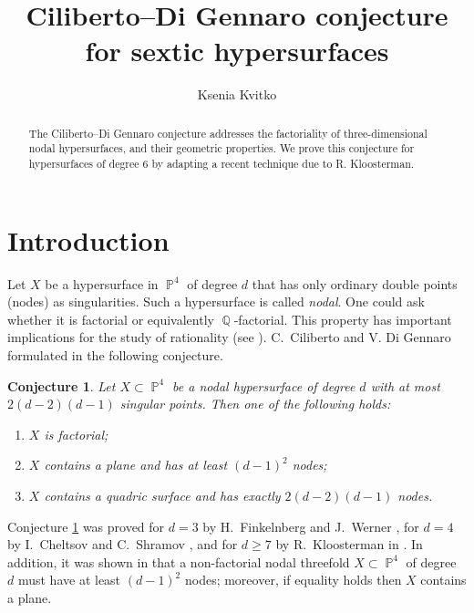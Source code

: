 \documentclass[a4paper,11pt,english,german]{amsart}
\title{Ciliberto--Di Gennaro conjecture for sextic hypersurfaces}
\author{Ksenia Kvitko}
\DeclareMathOperator{\IP}{\mathbb{P}}
\DeclareMathOperator{\Q}{\mathbb{Q}}
\newtheorem{conj}[thm]{Conjecture}
\theoremstyle{definition}
\begin{document}
\begin{abstract}
The Ciliberto--Di Gennaro conjecture addresses the factoriality of three-dimensional nodal hypersurfaces, and their geometric properties. We prove this conjecture for hypersurfaces of degree 6 by adapting a recent technique due to R. Kloosterman.
\end{abstract}

\maketitle

\tableofcontents 

\section{Introduction}


Let $X$ be a hypersurface in $\IP^4$ of degree $d$ that has only ordinary double points (nodes) as singularities. Such a hypersurface is called \emph{nodal}. One could ask whether it is factorial or equivalently $\Q$-factorial. This property has important implications for the study of rationality (see \cite{cheltsov2005birationally}). C.~Ciliberto and V. Di Gennaro formulated in \cite{ciliberto2004factoriality} the following conjecture.

\begin{conj}\label{conj} Let $X\subset\IP^4$ be a nodal hypersurface of degree $d$ with at most $2(d-2)(d-1)$ singular points.
Then one of the following holds:
\begin{enumerate}
	\item[\emph{(1)}] $X$ is factorial;
	\item[\emph{(2)}] $X$ contains a plane and has at least $(d-1)^2$ nodes;
	\item[\emph{(3)}] $X$ contains a quadric surface and has exactly $2(d-2)(d-1)$ nodes.
\end{enumerate}
\end{conj}

Conjecture \ref{conj} was proved for $d=3$ by H.~Finkelnberg and J.~Werner \cite{finkelnberg1989small}, for $d=4$ by I.~Cheltsov and C.~Shramov \cite{cheltsov2006nonrational,shramov2007factorial}, and for $d\geqslant 7$ by R.~Kloosterman in \cite{kloosterman2022maximal}. In addition, it was shown in \cite{cheltsov2010factoriality,cheltsov2010conjecture} that a non-factorial nodal threefold $X\subset \IP^4$ of degree $d$ must have at least $(d-1)^2$ nodes; moreover, if equality holds then $X$ contains a plane.
\end{document}
